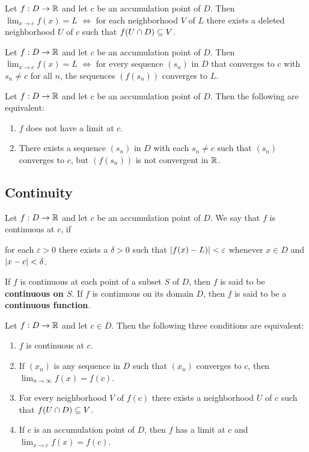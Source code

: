 \documentclass[12pt]{article}
\begin{document}
\begin{theorem}
  Let $f : D \rightarrow \mathbb{R}$ and let $c$  be an accumulation point of $D$.
  Then $\lim_{x \rightarrow c} f(x) = L$ $\iff$ for each neighborhood $V$ of $L$
  there exists a deleted neighborhood $U$ of $c$ such that $f(U \cap D) \subseteq V$.
\end{theorem}

\begin{theorem}
Let $f : D \rightarrow \mathbb{R}$ and let $c$ be an accumulation point of $D$. Then
$\lim_{x \rightarrow c} f(x) = L$ $\iff$ for every sequence $(s_n)$ in $D$ that
converges to $c$ with $s_n \ne c$ for all $n$, the sequences $(f(s_n))$
converges to $L$.
\end{theorem}

\begin{theorem}
  Let $f : D \rightarrow \mathbb{R}$ and let $c$ be an accumulation point of $D$.
  Then the following are equivalent:
  \begin{enumerate}
  \item $f$ does not have a limit at $c$.
  \item There exists a sequence $(s_n)$ in $D$ with each $s_n \ne c$ such that
    $(s_n)$ converges to $c$, but $(f(s_n))$ is not convergent in $\mathbb{R}$.
  \end{enumerate}
\end{theorem}

\subsection{Continuity}
\label{sec:orgf288a5c}
\begin{definition}[Continuous]
  Let $f  : D \rightarrow \mathbb{R}$  and let $c$ be  an accumulation point of  $D$. We say
  that $f$ is continuous at $c$, if
  \begin{center}
    for each $\varepsilon > 0$  there exists a $\delta > 0$ such that  $\left|f(x) - L)\right| < \varepsilon$
    whenever $x \in D$ and $\left|x - c\right| < \delta$.
  \end{center}
  If $f$ is continuous at each point of a subset $S$ of $D$, then $f$ is said
  to be \textbf{continuous on $S$}. If $f$ is continuous on its domain $D$,
  then $f$ is said to be a \textbf{continuous function}.
\end{definition}

\begin{theorem}
  Let $f : D \rightarrow \mathbb{R}$ and let $c \in D$. Then the following three
  conditions are equivalent:
  \begin{enumerate}
  \item $f$ is continuous at $c$.
  \item If $(x_n)$ is any sequence in $D$ such that $(x_n)$ converges to $c$,
    then $\lim_{n \rightarrow \infty} f(x) = f(c)$.
  \item For every neighborhood $V$ of $f(c)$ there exists a neighborhood $U$ of
    $c$ such that $f(U \cap D) \subseteq V$.
  \item If $c$ is an accumulation point of $D$, then $f$ has a limit at $c$ and
    $\lim_{x \rightarrow c} f(x) = f(c)$.
  \end{enumerate}
\end{theorem}
\end{document}
